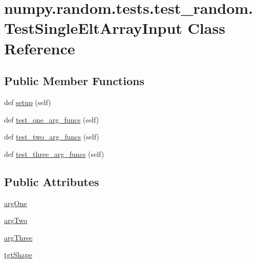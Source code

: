 \hypertarget{classnumpy_1_1random_1_1tests_1_1test__random_1_1TestSingleEltArrayInput}{}\section{numpy.\+random.\+tests.\+test\+\_\+random.\+Test\+Single\+Elt\+Array\+Input Class Reference}
\label{classnumpy_1_1random_1_1tests_1_1test__random_1_1TestSingleEltArrayInput}
\subsection*{Public Member Functions}
\begin{DoxyCompactItemize}
\item 
def \hyperlink{classnumpy_1_1random_1_1tests_1_1test__random_1_1TestSingleEltArrayInput_af4efc2f6fddf6ac69c3d52ba74a63081}{setup} (self)
\item 
def \hyperlink{classnumpy_1_1random_1_1tests_1_1test__random_1_1TestSingleEltArrayInput_aea840a285c20e0da4a7f2756f9b4fd72}{test\+\_\+one\+\_\+arg\+\_\+funcs} (self)
\item 
def \hyperlink{classnumpy_1_1random_1_1tests_1_1test__random_1_1TestSingleEltArrayInput_a71320ed9b4470e517cd74a56953a04a0}{test\+\_\+two\+\_\+arg\+\_\+funcs} (self)
\item 
def \hyperlink{classnumpy_1_1random_1_1tests_1_1test__random_1_1TestSingleEltArrayInput_aacc7ec5e69ff88370b41572d739e9727}{test\+\_\+three\+\_\+arg\+\_\+funcs} (self)
\end{DoxyCompactItemize}
\subsection*{Public Attributes}
\begin{DoxyCompactItemize}
\item 
\hyperlink{classnumpy_1_1random_1_1tests_1_1test__random_1_1TestSingleEltArrayInput_a0b769773c184900046d3a1927e9ca34f}{arg\+One}
\item 
\hyperlink{classnumpy_1_1random_1_1tests_1_1test__random_1_1TestSingleEltArrayInput_aa0f97e336e70f6d276244f91fc844d01}{arg\+Two}
\item 
\hyperlink{classnumpy_1_1random_1_1tests_1_1test__random_1_1TestSingleEltArrayInput_a4524784a979c37d3ddb07c3d4fb4362d}{arg\+Three}
\item 
\hyperlink{classnumpy_1_1random_1_1tests_1_1test__random_1_1TestSingleEltArrayInput_a4f378ccc95868a8e0588c14fd763b708}{tgt\+Shape}
\end{DoxyCompactItemize}


